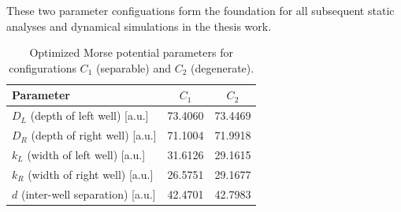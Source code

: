 \documentclass{subfiles}
\begin{document}
These two parameter configuations form the foundation for all subsequent static analyses and dynamical simulations in the thesis work. 
\begin{table}[h!]
  \centering
  \caption{Optimized Morse potential parameters for configurations \(C_1\) (separable) and \(C_2\) (degenerate).}
  \label{tab:optimized_params}
  \begin{tabular}{lcc}
    \toprule
    Parameter & \(C_1\) & \(C_2\) \\
    \midrule
    \(D_L\) (depth of left well)       [a.u.] & 73.4060 & 73.4469 \\
    \(D_R\) (depth of right well)      [a.u.] & 71.1004 & 71.9918 \\
    \(k_L\) (width of left well)       [a.u.] & 31.6126 & 29.1615 \\
    \(k_R\) (width of right well)      [a.u.] & 26.5751 & 29.1677 \\
    \(d\)   (inter-well separation)     [a.u.] & 42.4701 & 42.7983 \\
    \bottomrule
  \end{tabular}
\end{table}
\end{document}
